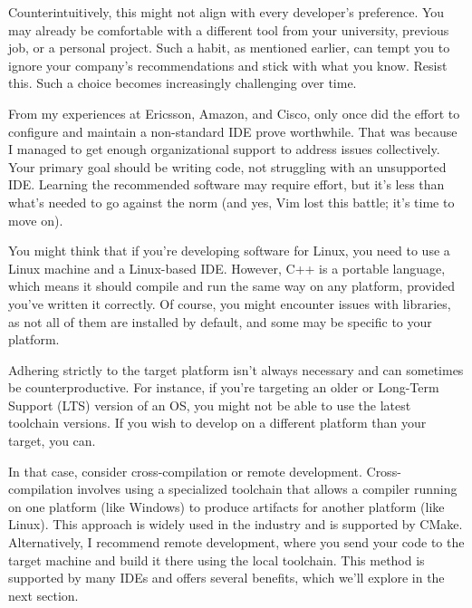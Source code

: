 
Counterintuitively, this might not align with every developer’s preference. You may already be comfortable with a different tool from your university, previous job, or a personal project. Such a habit, as mentioned earlier, can tempt you to ignore your company’s recommendations and stick with what you know. Resist this. Such a choice becomes increasingly challenging over time.

From my experiences at Ericsson, Amazon, and Cisco, only once did the effort to configure and maintain a non-standard IDE prove worthwhile. That was because I managed to get enough organizational support to address issues collectively.
Your primary goal should be writing code, not struggling with an unsupported IDE. Learning the recommended software may require effort, but it’s less than what’s needed to go against the norm (and yes, Vim lost this battle; it’s time to move on).


You might think that if you’re developing software for Linux, you need to use a Linux machine and a Linux-based IDE. However, C++ is a portable language, which means it should compile and run the same way on any platform, provided you’ve written it correctly. Of course, you might encounter issues with libraries, as not all of them are installed by default, and some may be specific to your platform.

Adhering strictly to the target platform isn’t always necessary and can sometimes be counterproductive. For instance, if you’re targeting an older or Long-Term Support (LTS) version of an OS, you might not be able to use the latest toolchain versions. If you wish to develop on a different platform than your target, you can.

In that case, consider cross-compilation or remote development. Cross-compilation involves using a specialized toolchain that allows a compiler running on one platform (like Windows) to produce artifacts for another platform (like Linux). This approach is widely used in the industry and is supported by CMake. Alternatively, I recommend remote development, where you send your code to the target machine and build it there using the local toolchain. This method is supported by many IDEs and offers several benefits, which we’ll explore in the next section.


